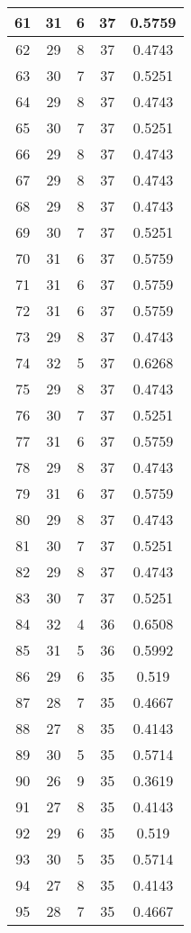 \documentclass[letterpaper, 12pt]{article}
\begin{document}
\begin{longtable}{|c|c|c|c|c|}
\hline
61 & 31 & 6 & 37 & 0.5759 \\
\hline
62 & 29 & 8 & 37 & 0.4743 \\
\hline
63 & 30 & 7 & 37 & 0.5251 \\
\hline
64 & 29 & 8 & 37 & 0.4743 \\
\hline
65 & 30 & 7 & 37 & 0.5251 \\
\hline
66 & 29 & 8 & 37 & 0.4743 \\
\hline
67 & 29 & 8 & 37 & 0.4743 \\
\hline
68 & 29 & 8 & 37 & 0.4743 \\
\hline
69 & 30 & 7 & 37 & 0.5251 \\
\hline
70 & 31 & 6 & 37 & 0.5759 \\
\hline
71 & 31 & 6 & 37 & 0.5759 \\
\hline
72 & 31 & 6 & 37 & 0.5759 \\
\hline
73 & 29 & 8 & 37 & 0.4743 \\
\hline
74 & 32 & 5 & 37 & 0.6268 \\
\hline
75 & 29 & 8 & 37 & 0.4743 \\
\hline
76 & 30 & 7 & 37 & 0.5251 \\
\hline
77 & 31 & 6 & 37 & 0.5759 \\
\hline
78 & 29 & 8 & 37 & 0.4743 \\
\hline
79 & 31 & 6 & 37 & 0.5759 \\
\hline
80 & 29 & 8 & 37 & 0.4743 \\
\hline
81 & 30 & 7 & 37 & 0.5251 \\
\hline
82 & 29 & 8 & 37 & 0.4743 \\
\hline
83 & 30 & 7 & 37 & 0.5251 \\
\hline
84 & 32 & 4 & 36 & 0.6508 \\
\hline
85 & 31 & 5 & 36 & 0.5992 \\
\hline
86 & 29 & 6 & 35 & 0.519 \\
\hline
87 & 28 & 7 & 35 & 0.4667 \\
\hline
88 & 27 & 8 & 35 & 0.4143 \\
\hline
89 & 30 & 5 & 35 & 0.5714 \\
\hline
90 & 26 & 9 & 35 & 0.3619 \\
\hline
91 & 27 & 8 & 35 & 0.4143 \\
\hline
92 & 29 & 6 & 35 & 0.519 \\
\hline
93 & 30 & 5 & 35 & 0.5714 \\
\hline
94 & 27 & 8 & 35 & 0.4143 \\
\hline
95 & 28 & 7 & 35 & 0.4667 \\

\end{longtable}
\end{document}
